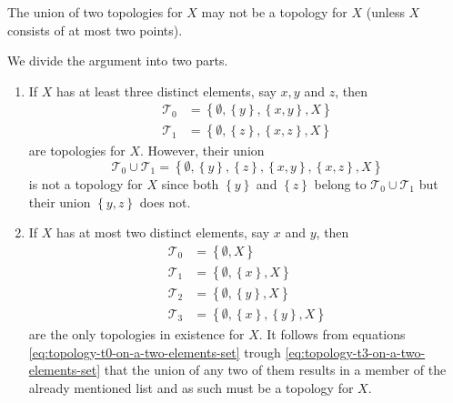 \begin{problem}
  The union of two topologies for \(X\) may not be a topology for \(X\) (unless
  \(X\) consists of at most two points).
  \label{problem:the-union-of-topologies-may-not-be-a-topology}
\end{problem}

\begin{solution}
  We divide the argument into two parts.
  \begin{enumerate}
    \item
      If \(X\) has at least three distinct elements, say \(x,y\) and \(z\), then
      \begin{align}
        \label{eq:topology-t0-for-a-set-with-at-least-three-elements}
        \mathcal{T}_{0}&=\left\{\emptyset,\left\{y\right\},\left\{x,y\right\},X\right\}\\
        \label{eq:topology-t1-for-a-set-with-at-least-three-elements}
        \mathcal{T}_{1}&=\left\{\emptyset,\left\{z\right\},\left\{x,z\right\},X\right\}
      \end{align}
      are topologies for \(X\). However, their union
      \begin{equation}
        \mathcal{T}_{0}\cup\mathcal{T}_{1}=\left\{\emptyset,\left\{y\right\},\left\{z\right\},\left\{x,y\right\},\left\{x,z\right\},X\right\}
      \end{equation}
      is not a topology for \(X\) since both \(\left\{y\right\}\) and
      \(\left\{z\right\}\) belong to \(\mathcal{T}_{0}\cup\mathcal{T}_{1}\) but
      their union \(\left\{y,z\right\}\) does not.
    \item
      If \(X\) has at most two distinct elements, say \(x\) and \(y\),
      then
      \begin{align}
        \label{eq:topology-t0-on-a-two-elements-set}
        \mathcal{T}_{0}&=\left\{\emptyset,X\right\}\\
        \label{eq:topology-t1-on-a-two-elements-set}
        \mathcal{T}_{1}&=\left\{\emptyset,\left\{x\right\},X\right\}\\
        \label{eq:topology-t2-on-a-two-elements-set}
        \mathcal{T}_{2}&=\left\{\emptyset,\left\{y\right\},X\right\}\\
        \label{eq:topology-t3-on-a-two-elements-set}
        \mathcal{T}_{3}&=\left\{\emptyset,\left\{x\right\},\left\{y\right\},X\right\}
      \end{align}
      are the only topologies in existence for \(X\). It follows from equations
      \eqref{eq:topology-t0-on-a-two-elements-set} trough
      \eqref{eq:topology-t3-on-a-two-elements-set} that the union of any two of
      them results in a member of the already mentioned list and as such must
      be a topology for \(X\).
  \end{enumerate}
\end{solution}

